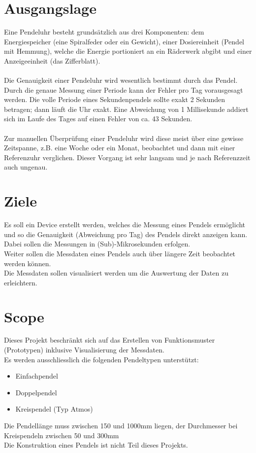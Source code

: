 \section{Ausgangslage}
Eine Pendeluhr besteht grundsätzlich aus drei Komponenten: dem Energiespeicher (eine Spiralfeder
oder ein Gewicht), einer Dosiereinheit (Pendel mit Hemmung), welche die Energie portioniert an ein
Räderwerk abgibt und einer Anzeigeeinheit (das Zifferblatt).\\
\\
Die Genauigkeit einer Pendeluhr wird wesentlich bestimmt durch das Pendel. 
Durch die genaue Messung einer Periode kann der Fehler pro Tag vorausgesagt werden.
Die volle Periode eines Sekundenpendels sollte exakt 2 Sekunden betragen; dann läuft die Uhr exakt.
Eine Abweichung von 1 Millisekunde addiert sich im Laufe des Tages auf einen Fehler von ca. 43 Sekunden.\\
\\
Zur manuellen Überprüfung einer Pendeluhr wird diese meist über eine gewisse Zeitspanne, z.B. eine Woche oder ein Monat, beobachtet und dann mit einer Referenzuhr verglichen.
Dieser Vorgang ist sehr langsam und je nach Referenzzeit auch ungenau.

\section{Ziele}
Es soll ein Device erstellt werden, welches die Messung eines Pendels ermöglicht und so die Genauigkeit (Abweichung pro Tag) des Pendels direkt anzeigen kann.\\
Dabei sollen die Messungen in (Sub)-Mikrosekunden erfolgen.\\
Weiter sollen die Messdaten eines Pendels auch über längere Zeit beobachtet werden können.\\
Die Messdaten sollen visualisiert werden um die Auswertung der Daten zu erleichtern.

\section{Scope}
Dieses Projekt beschränkt sich auf das Erstellen von Funktionsmuster (Prototypen) inklusive Visualisierung der Messdaten.\\
Es werden ausschliesslich die folgenden Pendeltypen unterstützt:
\begin{itemize}
	\item Einfachpendel
	\item Doppelpendel
	\item Kreispendel (Typ Atmos)
\end{itemize}
Die Pendellänge muss zwischen 150 und 1000mm liegen, der Durchmesser bei Kreispendeln zwischen 50 und 300mm\\
Die Konstruktion eines Pendels ist nicht Teil dieses Projekts.

